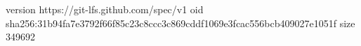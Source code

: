 version https://git-lfs.github.com/spec/v1
oid sha256:31b94fa7e3792f66f85c23c8ccc3c869cddf1069e3fcac556bcb409027e1051f
size 349692
